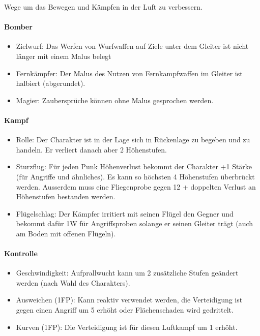 \documentclass{article}
\begin{document}
Wege um das Bewegen und Kämpfen in der Luft zu verbessern.

\paragraph{Bomber}

\begin{itemize}
\item Zielwurf: Das Werfen von Wurfwaffen auf Ziele unter dem Gleiter ist nicht länger mit einem Malus belegt
\item Fernkämpfer: Der Malus des Nutzen von Fernkampfwaffen im Gleiter ist halbiert (abgerundet).
\item Magier: Zaubersprüche können ohne Malus gesprochen werden.
\end{itemize}

\paragraph{Kampf}

\begin{itemize}
\item Rolle: Der Charakter ist in der Lage sich in Rückenlage zu begeben und zu handeln. Er verliert danach aber 2 Höhenstufen.
\item Sturzflug: Für jeden Punk Höhenverlust bekommt der Charakter +1 Stärke (für Angriffe und ähnliches). Es kann so höchsten 4 Höhenstufen überbrückt werden. Ausserdem muss eine Fliegenprobe gegen 12 + doppelten Verlust an Höhenstufen bestanden werden.
\item Flügelschlag: Der Kämpfer irritiert mit seinen Flügel den Gegner und bekommt dafür 1W für Angriffsproben solange er seinen Gleiter trägt (auch am Boden mit offenen Flügeln).
\end{itemize}

\paragraph{Kontrolle}

\begin{itemize}
\item Geschwindigkeit: Aufprallwucht kann um 2 zusätzliche Stufen geändert werden (nach Wahl des Charakters).
\item Ausweichen (1FP): Kann reaktiv verwendet werden, die Verteidigung ist gegen einen Angriff um 5 erhöht oder Flächenschaden wird gedrittelt.
\item Kurven (1FP): Die Verteidigung ist für diesen Luftkampf um 1 erhöht.
\end{itemize}
\end{document}
